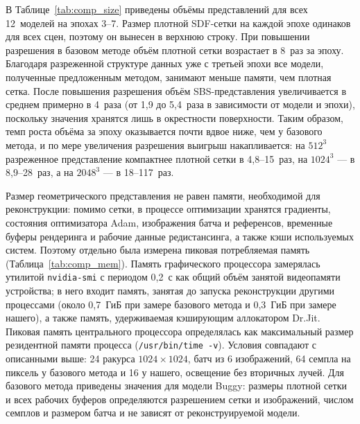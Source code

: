 В Таблице~\ref{tab:comp_size} приведены объёмы представлений для всех 12~моделей на эпохах 3--7. Размер плотной SDF-сетки на каждой эпохе одинаков для всех сцен, поэтому он вынесен в верхнюю строку. При повышении разрешения в базовом методе объём плотной сетки возрастает в 8~раз за эпоху. Благодаря разреженной структуре данных уже с третьей эпохи все модели, полученные предложенным методом, занимают меньше памяти, чем плотная сетка. После повышения разрешения объём SBS-представления увеличивается в среднем примерно в 4~раза (от 1,9 до 5,4~раза в зависимости от модели и эпохи), поскольку значения хранятся лишь в окрестности поверхности. Таким образом, темп роста объёма за эпоху оказывается почти вдвое ниже, чем у базового метода, и по мере увеличения разрешения выигрыш накапливается: на $512^3$ разреженное представление компактнее плотной сетки в 4,8--15~раз, на $1024^3$ --- в 8,9--28~раз, а на $2048^3$ --- в 18--117~раз.


Размер геометрического представления не равен памяти, необходимой для реконструкции: помимо сетки, в процессе оптимизации хранятся градиенты, состояния оптимизатора Adam, изображения батча и референсов, временные буферы рендеринга и рабочие данные редистансинга, а также кэши используемых систем. Поэтому отдельно была измерена пиковая потребляемая память (Таблица~\ref{tab:comp_mem}). Память графического процессора замерялась утилитой \texttt{nvidia-smi} с периодом 0,2~с как общий объём занятой видеопамяти устройства; в него входит память, занятая до запуска реконструкции другими процессами (около 0,7~ГиБ при замере базового метода и 0,3~ГиБ при замере нашего), а также память, удерживаемая кэширующим аллокатором Dr.Jit. Пиковая память центрального процессора определялась как максимальный размер резидентной памяти процесса (\texttt{/usr/bin/time -v}). Условия совпадают с описанными выше: 24 ракурса $1024\times1024$, батч из 6 изображений, 64 семпла на пиксель у базового метода и 16 у нашего, освещение без вторичных лучей. Для базового метода приведены значения для модели Buggy: размеры плотной сетки и всех рабочих буферов определяются разрешением сетки и изображений, числом семплов и размером батча и не зависят от реконструируемой модели.

